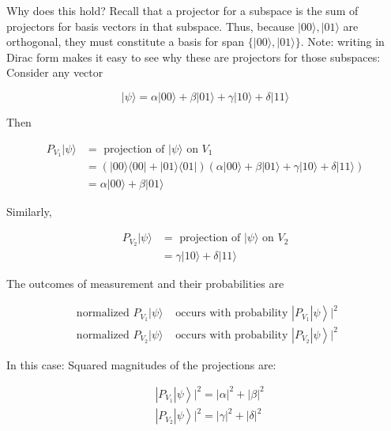 \documentclass[main.tex]{subfiles}
\begin{document}
    Why does this hold? Recall that a projector for a subspace is the sum of projectors for basis vectors in that subspace. Thus, because $|00\rangle,|01\rangle$ are orthogonal, they must constitute a basis for span $\{|00\rangle,|01\rangle\}$. Note: writing in Dirac form makes it easy to see why these are projectors for those subspaces: Consider any vector
    
    $$
    |\psi\rangle=\alpha|00\rangle+\beta|01\rangle+\gamma|10\rangle+\delta|11\rangle
    $$
    
    Then
    
    $$
    \begin{aligned}
    P_{V_{1}}|\psi\rangle &=\text { projection of }|\psi\rangle \text { on } V_{1} \\
    &=(|00\rangle\langle 00|+| 01\rangle\langle 01|)(\alpha|00\rangle+\beta|01\rangle+\gamma|10\rangle+\delta|11\rangle) \\
    &=\alpha|00\rangle+\beta|01\rangle
    \end{aligned}
    $$
    
    Similarly,
    
    $$
    \begin{aligned}
    P_{V_{2}}|\psi\rangle &=\text { projection of }|\psi\rangle \text { on } V_{2} \\
    &=\gamma|10\rangle+\delta|11\rangle
    \end{aligned}
    $$
    
    The outcomes of measurement and their probabilities are
    
    $$
    \begin{array}{ll}
    \text { normalized } P_{V_{1}}|\psi\rangle & \text { occurs with probability } \left.\left|P_{V_{1}}\right| \psi\right\rangle\left.\right|^{2} \\
    \text { normalized } P_{V_{2}}|\psi\rangle & \text { occurs with probability } \left.\left|P_{V_{2}}\right| \psi\right\rangle\left.\right|^{2}
    \end{array}
    $$
    
    In this case: Squared magnitudes of the projections are:
    
    $$
    \begin{aligned}
    &\left.\left|P_{V_{1}}\right| \psi\right\rangle\left.\right|^{2}=|\alpha|^{2}+|\beta|^{2} \\
    &\left.\left|P_{V_{2}}\right| \psi\right\rangle\left.\right|^{2}=|\gamma|^{2}+|\delta|^{2}
    \end{aligned}
    $$
    
\end{document}
